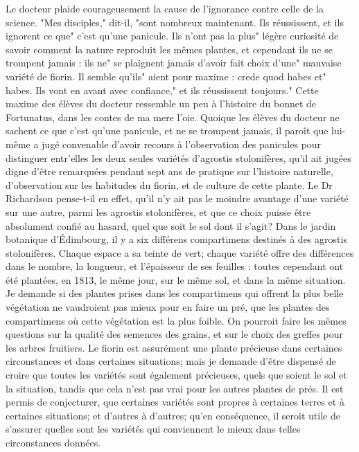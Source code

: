 Le docteur plaide courageusement la cause de l'ignorance contre celle de la science. "Mes disciples," dit-il, "sont nombreux maintenant. Ils réussissent, et ils ignorent ce que" c'est qu'une panicule. Ils n'ont pas la plus" légère curiosité de savoir comment la nature reproduit les mêmes plantes, et cependant ils ne se trompent jamais : ils ne" se plaignent jamais d'avoir fait choix d'une" mauvaise variété de fiorin. Il semble qu'ils" aient pour maxime : crede quod habes et" habes. Ils vont en avant avec confiance," et ils réussissent toujours." Cette maxime des élèves du docteur ressemble un peu à l'histoire du bonnet de Fortunatus, dans les contes de ma mere l'oie.\setcounter{page}{258} Quoique les élèves du docteur ne sachent ce que c'est qu'une panicule, et ne se trompent jamais, il paroît que lui-même a jugé convenable d'avoir recours à l'observation des panicules pour distinguer entr'elles les deux seules variétés d'agrostis stolonifères, qu'il ait jugées digne d'être remarquées pendant sept ans de pratique sur l'histoire naturelle, d'observation sur les habitudes du fiorin, et de culture de cette plante. Le Dr Richardson pense-t-il en effet, qu'il n'y ait pas le moindre avantage d'une variété sur une autre, parmi les agrostis stolonifères, et que ce choix puisse être absolument confié au hasard, quel que soit le sol dont il s'agit? Dans le jardin botanique d'Édimbourg, il y a six différens compartimens destinés à des agrostis stolonifères. Chaque espace a sa teinte de vert; chaque variété offre des différences dans le nombre, la longueur, et l'épaisseur de ses feuilles : toutes cependant ont été plantées, en 1813, le même jour, sur le même sol, et dans la même situation.
Je demande si des plantes prises dans les compartimens qui offrent la plus belle végétation ne vaudroient pas mieux pour en faire un pré, que les plantes des compartimens où cette végétation est la plus foible.
On pourroit faire les mêmes questions sur\setcounter{page}{259} la qualité des semences des grains, et sur le choix des greffes pour les arbres fruitiers.
Le fiorin est assurément une plante précieuse dans certaines circonstances et dans certaines situations; mais je demande d’être dispensé de croire que toutes les variétés sont également précieuses, quels que soient le sol et la situation, tandis que cela n’est pas vrai pour les autres plantes de prés. Il est permis de conjecturer, que certaines variétés sont propres à certaines terres et à certaines situations; et d’autres à d’autres; qu’en conséquence, il seroit utile de s’assurer quelles sont les variétés qui conviennent le mieux dans telles circonstances données.
